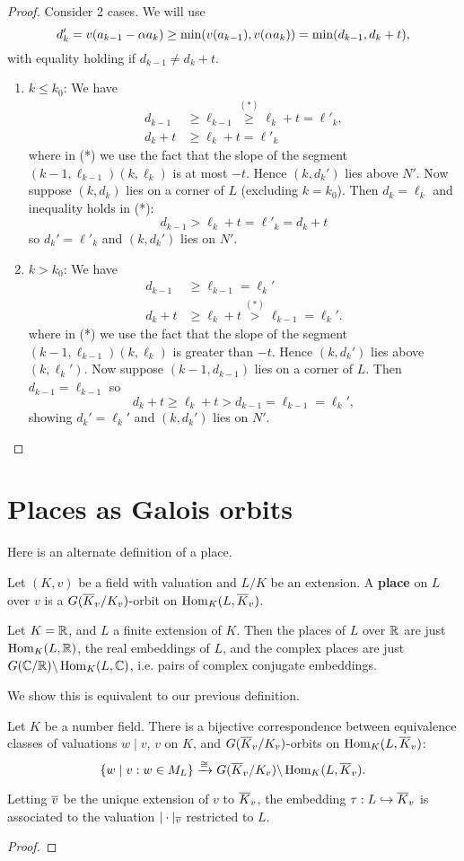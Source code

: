 \begin{proof}
Consider 2 cases. We will use 
\[
d_k'=v(a_{k-1}-\alpha a_{k})\ge 
\min(v(a_{k-1}),v(\alpha a_{k}))=\min(d_{k-1},d_k+t),
\]
with equality holding if $d_{k-1}\ne d_k+t$.
\begin{enumerate}
\item $k\le k_0$: We have
\begin{align*}
d_{k-1}& \ge \ell_{k-1}\stackrel{(*)}{\ge} \ell_k+t=\ell'_k,\\
d_k+t& \ge \ell_k+t= \ell'_k
\end{align*}
where in (*) we use the fact that the slope of the segment $(k-1,\ell_{k-1})(k,\ell_k)$ is at most $-t$. 
Hence $(k,d_k')$ lies above $N'$. Now suppose $(k,d_k)$ lies on a corner of $L$ (excluding $k=k_0$). Then $d_k=\ell_k$ and inequality holds in (*):
\[
d_{k-1}>\ell_k+t=\ell'_k=d_k+t
\]
so $d_k'=\ell'_k$ and $(k,d_k')$ lies on $N'$.
\item $k>k_0$: We have
\begin{align*}
d_{k-1}&\ge\ell_{k-1}=\ell_k'\\
d_{k}+t&\ge \ell_k+t\stackrel{(*)}{>} \ell_{k-1}=\ell_k'.
\end{align*}
where in (*) we use the fact that the slope of the segment $(k-1,\ell_{k-1})(k,\ell_k)$ is greater than $-t$. Hence $(k,d_k')$ lies above $(k,\ell_k')$. Now suppose $(k-1,d_{k-1})$ lies on a corner of $L$. Then $d_{k-1}=\ell_{k-1}$ so
\[
d_{k}+t\ge\ell_k+t>d_{k-1}=\ell_{k-1}=\ell_k',
\]
showing $d_k'=\ell_k'$ and $(k,d_k')$ lies on $N'$.\qedhere
\end{enumerate}
\end{proof}
%
\section{Places as Galois orbits}
Here is an alternate definition of a place.
\begin{df}
Let $(K,v)$ be a field with valuation and $L/K$ be an extension. A \textbf{place} on $L$ over $v$ is a $G(\overline{K}_v/K_v)$-orbit on $\operatorname{Hom}_K(L,\overline{K}_v)$.
\end{df}
\begin{ex}
Let $K=\mathbb{R}$, and $L$ a finite extension of $K$. Then the places of $L$ over $\mathbb{R}$ are just $\operatorname{Hom}_K(L,\mathbb{R})$, the real embeddings of $L$, and the complex places are just $G(\mathbb{C}/\mathbb{R})\backslash\operatorname{Hom}_K(L,\mathbb{C})$, i.e. pairs of complex conjugate embeddings.
\end{ex}
We show this is equivalent to our previous definition.
\begin{thm}
Let $K$ be a number field. 
There is a bijective correspondence between equivalence classes of valuations $w\mid v$, $v$ on $K$, and $G(\overline{K}_v/K_v)$-orbits on $\operatorname{Hom}_K(L,\overline{K}_v)$:
\[
\left\{{w\mid v}:{w\in M_L}\right\}\xrightarrow{\cong} G(\overline{K}_v/K_v)\backslash\operatorname{Hom}_K(L,\overline{K}_v).
\]

Letting $\overline{v}$ be the unique extension of $v$ to $\overline{K}_v$, 
the embedding $\tau:L\hookrightarrow \overline{K}_v$ is associated to the valuation $|\cdot|_{\overline{v}}$ restricted to $L$.
\end{thm}
\begin{proof}
\end{proof}
%
